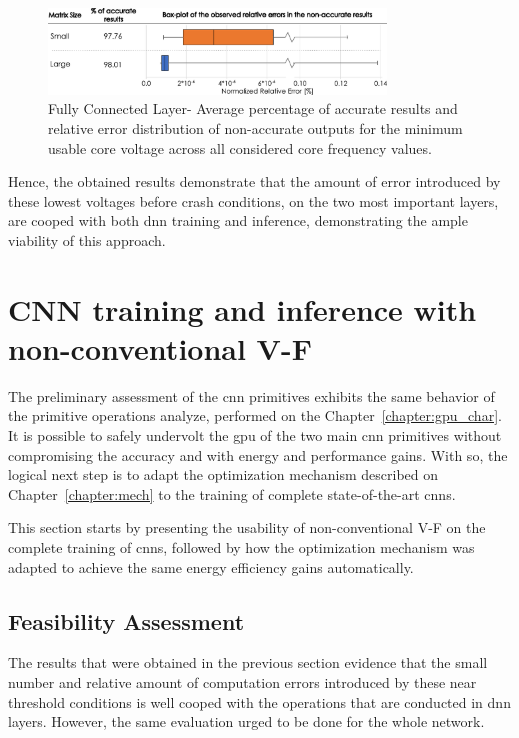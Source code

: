 \begin{figure}[htbp]
    \centering
        \includegraphics[width=0.8\textwidth]{Figures/Application To Deep Learning/MatrixMul_Error_Distribution.pdf}
        \caption{Fully Connected Layer- Average percentage of accurate results and relative error distribution of non-accurate outputs for the minimum usable core voltage across all considered core frequency values.}
    \label{fig:MatrixMult_errors}
\end{figure}

Hence, the obtained results demonstrate that the amount of error introduced by these lowest voltages before crash conditions, on the two most important layers, are cooped with both \acrshort{dnn} training and inference, demonstrating the ample viability of this approach.


\section{CNN training and inference with non-conventional V-F}
\label{section:enhanced}

The preliminary assessment of the \acrshort{cnn} primitives exhibits the same behavior of the primitive operations analyze, performed on the Chapter~\ref{chapter:gpu_char}. It is possible to safely undervolt the \acrshort{gpu} of the two main \acrshort{cnn} primitives without compromising the accuracy and with energy and performance gains. With so, the logical next step is to adapt the optimization mechanism described on Chapter~\ref{chapter:mech} to the training of complete state-of-the-art \acrshort{cnn}s.


This section starts by presenting the usability of non-conventional V-F on the complete training of \acrshort{cnn}s, followed by how the optimization mechanism was adapted to achieve the same energy efficiency gains automatically.

\subsection{Feasibility Assessment}
\label{sec:fea_ass}
The results that were obtained in the previous section evidence that the small number and relative amount of computation errors introduced by these near threshold conditions is well cooped with the operations that are conducted in \acrshort{dnn} layers. However, the same evaluation urged to be done for the whole network.


